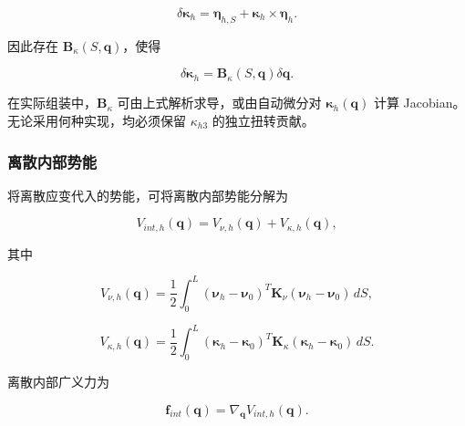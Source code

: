\begin{equation}
\label{eq:galerkin-2-25}
\delta\bm{\kappa}_{h} = \bm{\eta}_{h,S} + \bm{\kappa}_{h} \times \bm{\eta}_{h}.
\end{equation}

因此存在 \(\mathbf{B}_{\kappa}\left( S,\mathbf{q} \right)\)，使得

\begin{equation}
\label{eq:galerkin-2-26}
\delta\bm{\kappa}_{h} = \mathbf{B}_{\kappa}\left( S,\mathbf{q} \right)\delta\mathbf{q}.
\end{equation}

在实际组装中，\(\mathbf{B}_{\kappa}\) 可由上式解析求导，或由自动微分对 \(\bm{\kappa}_{h}\left( \mathbf{q} \right)\) 计算 Jacobian。无论采用何种实现，均必须保留 \(\kappa_{h3}\) 的独立扭转贡献。

\subsubsection{离散内部势能}\label{sec:galerkin-2-3-3}

将离散应变代入的势能，可将离散内部势能分解为

\begin{equation}
\label{eq:galerkin-2-27}
V_{int,h}\left( \mathbf{q} \right) = V_{\nu,h}\left( \mathbf{q} \right) + V_{\kappa,h}\left( \mathbf{q} \right),
\end{equation}

其中

\begin{equation}
\label{eq:galerkin-2-28}
V_{\nu,h}\left( \mathbf{q} \right) = \frac{1}{2}\int_{0}^{L}\left( \bm{\nu}_{h} - \bm{\nu}_{0} \right)^{T}\mathbf{K}_{\nu}\left( \bm{\nu}_{h} - \bm{\nu}_{0} \right)\, dS,
\end{equation}

\begin{equation}
\label{eq:galerkin-2-29}
V_{\kappa,h}\left( \mathbf{q} \right) = \frac{1}{2}\int_{0}^{L}\left( \bm{\kappa}_{h} - \bm{\kappa}_{0} \right)^{T}\mathbf{K}_{\kappa}\left( \bm{\kappa}_{h} - \bm{\kappa}_{0} \right)\, dS.
\end{equation}

离散内部广义力为

\begin{equation}
\label{eq:galerkin-2-30}
\mathbf{f}_{int}\left( \mathbf{q} \right) = \nabla_{\mathbf{q}}V_{int,h}\left( \mathbf{q} \right).
\end{equation}

